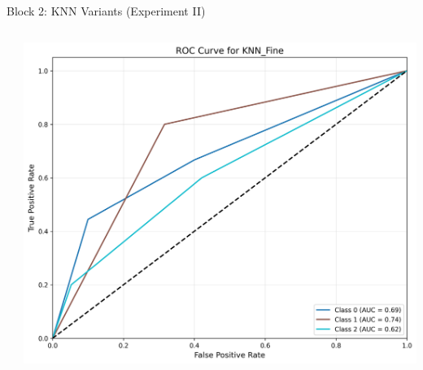 \documentclass[9pt]{beamer}
\begin{document}
\begin{frame}{Block 2: KNN Variants (Experiment II)}
\begin{columns}
\begin{column}{0.33\textwidth}
        \end{column}
        \begin{column}{0.33\textwidth}
            \centering
            \includegraphics[width=\textwidth]{code/ResultsMainAugZip/plots/Block2_KNN_Variants_Experiment_II/roc_curve_KNN_Fine.png}
        \end{column}
    \end{columns}
    \end{frame}
    
\end{document}
